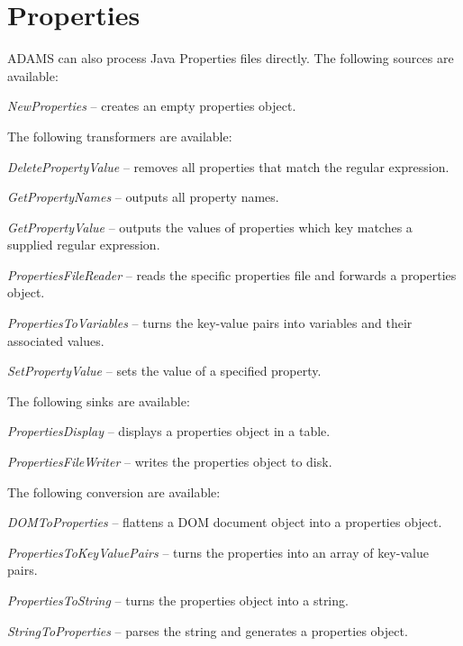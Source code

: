 \section{Properties}
\label{properties}
ADAMS can also process Java Properties files directly.
The following sources are available:
\begin{tight_itemize}
	\item \textit{NewProperties} -- creates an empty properties object.
\end{tight_itemize}
The following transformers are available:
\begin{tight_itemize}
	\item \textit{DeletePropertyValue} -- removes all properties that match the
	regular expression.
	\item \textit{GetPropertyNames} -- outputs all property names.
	\item \textit{GetPropertyValue} -- outputs the values of properties
	which key matches a supplied regular expression.
	\item \textit{PropertiesFileReader} -- reads the specific properties file 
	and forwards a properties object.
	\item \textit{PropertiesToVariables} -- turns the key-value pairs into
	 variables and their associated values.
	\item \textit{SetPropertyValue} -- sets the value of a specified property.
\end{tight_itemize}
The following sinks are available:
\begin{tight_itemize}
	\item \textit{PropertiesDisplay} -- displays a properties object in a table.
	\item \textit{PropertiesFileWriter} -- writes the properties object to disk.
\end{tight_itemize}
The following conversion are available:
\begin{tight_itemize}
	\item \textit{DOMToProperties} -- flattens a DOM document object into a 
	properties object.
	\item \textit{PropertiesToKeyValuePairs} -- turns the properties into an
	array of key-value pairs.
	\item \textit{PropertiesToString} -- turns the properties object into a string.
	\item \textit{StringToProperties} -- parses the string and generates a properties object.
\end{tight_itemize}


